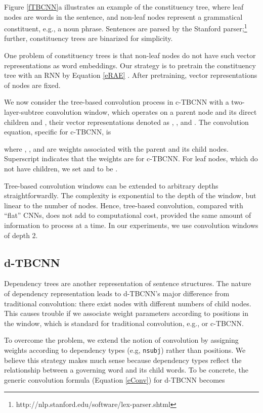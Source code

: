 \documentclass[11pt,a4paper]{article}
\begin{document}
Figure \ref{fTBCNN}a illustrates an example of the constituency tree, where
leaf nodes are words in the sentence, and
non-leaf nodes represent a grammatical constituent,
e.g., a noun phrase. Sentences are parsed by the Stanford parser;\footnote{
http://nlp.stanford.edu/software/lex-parser.shtml} further,
constituency trees are binarized for simplicity.

One problem of constituency trees is that non-leaf nodes do not have such vector representations as word embeddings.
Our strategy is to pretrain the constituency tree with an RNN by Equation \ref{eRAE} \cite{RAE}.
After pretraining, vector representations of nodes are fixed.

We now consider the tree-based convolution process in c-TBCNN with a two-layer-subtree
convolution window,
which operates on a parent node  and its direct children  and , their vector representations denoted as , , and .
The convolution equation, specific for c-TBCNN, is

\vspace{-.3cm}


\vspace{-.1cm}

\noindent where
, , and  are weights associated with
the parent and its child nodes.
Superscript  indicates that the weights are for c-TBCNN.
For leaf nodes, which do not have children,
we set  and  to be .


Tree-based convolution windows can be extended to arbitrary depths straightforwardly.
The complexity is exponential to the depth of the window,
but linear to the number of nodes.
Hence, tree-based convolution, compared with ``flat'' CNNs,
does not add to computational cost, provided the same amount of information to process
at a time. In our experiments, we use convolution windows of depth 2.

\subsection{d-TBCNN}\label{ssdTBCNN}

Dependency trees are another representation of sentence structures.
The nature of dependency representation
leads to d-TBCNN's major difference from traditional convolution:
there exist nodes with different numbers of child nodes.
This causes trouble if we associate weight parameters according to
positions in the window, which is standard for traditional convolution, e.g.,
 or c-TBCNN.

To overcome the problem, we extend the notion of convolution by
assigning weights according to dependency types
(e.g, \verb|nsubj|) rather than positions.
We believe this strategy makes much sense because dependency types \cite{dependencyparsing} 
reflect the relationship between a governing word and its child words.
To be concrete, the generic convolution formula (Equation \ref{eConv}) for d-TBCNN becomes
\end{document}
